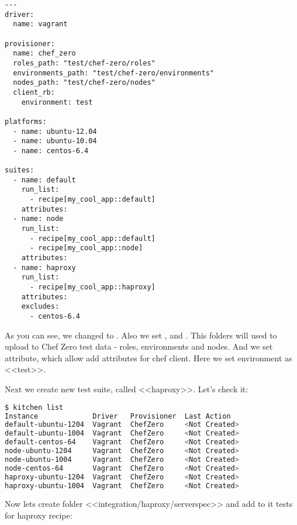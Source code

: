 \begin{lstlisting}[label=lst:testing-chef-zero17]
---
driver:
  name: vagrant

provisioner:
  name: chef_zero
  roles_path: "test/chef-zero/roles"
  environments_path: "test/chef-zero/environments"
  nodes_path: "test/chef-zero/nodes"
  client_rb:
    environment: test

platforms:
  - name: ubuntu-12.04
  - name: ubuntu-10.04
  - name: centos-6.4

suites:
  - name: default
    run_list:
      - recipe[my_cool_app::default]
    attributes:
  - name: node
    run_list:
      - recipe[my_cool_app::default]
      - recipe[my_cool_app::node]
    attributes:
  - name: haproxy
    run_list:
      - recipe[my_cool_app::haproxy]
    attributes:
    excludes:
      - centos-6.4
\end{lstlisting}

As you can see, we changed  to . Also we set ,  and . This folders will used to upload to Chef Zero test data - roles, environments and nodes. And we set  attribute, which allow add attributes for chef client. Here we set environment as <<test>>.

Next we create new test suite, called <<haproxy>>. Let's check it:

\begin{lstlisting}[language=Bash,label=lst:testing-chef-zero18]
$ kitchen list
Instance             Driver   Provisioner  Last Action
default-ubuntu-1204  Vagrant  ChefZero     <Not Created>
default-ubuntu-1004  Vagrant  ChefZero     <Not Created>
default-centos-64    Vagrant  ChefZero     <Not Created>
node-ubuntu-1204     Vagrant  ChefZero     <Not Created>
node-ubuntu-1004     Vagrant  ChefZero     <Not Created>
node-centos-64       Vagrant  ChefZero     <Not Created>
haproxy-ubuntu-1204  Vagrant  ChefZero     <Not Created>
haproxy-ubuntu-1004  Vagrant  ChefZero     <Not Created>
\end{lstlisting}

Now lets create folder <<integration/haproxy/serverspec>> and add to it tests for haproxy recipe:

